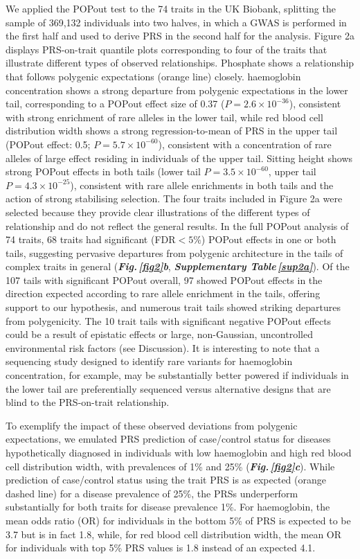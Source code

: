 \documentclass[12pt]{zHenriquesLab-StyleBioRxiv}
\newcommand\dref[2]{\normalsize{\textbf{\textit{Fig.\,\ref{#1}#2}}}\normalsize{}}
\newcommand\stref[1]{\normalsize{\textbf{\textit{Supplementary Table\,\ref{#1}}}}\normalsize{}}
\begin{document}
%
We applied the POPout test to the 74 traits in the UK Biobank, 
splitting the sample of 369,132 individuals into two halves, 
in which a GWAS is performed in the first half and used to derive 
PRS in the second half for the analysis. 
Figure 2a  displays PRS-on-trait quantile plots corresponding 
to four of the traits that illustrate different types of 
observed relationships. Phosphate shows a relationship that 
follows polygenic expectations (orange line) closely. 
haemoglobin concentration shows a strong departure from 
polygenic expectations in the lower tail, corresponding 
to a POPout effect size of 0.37 ($P = 2.6 \times 10^{-36}$), 
consistent with strong enrichment of rare alleles in the lower 
tail, while red blood cell distribution width shows a strong 
regression-to-mean of PRS in the upper tail (POPout effect: 
0.5; $P = 5.7 \times 10^{-60}$), consistent with a concentration
of rare alleles of large effect residing in individuals of 
the upper tail. Sitting height shows strong POPout effects in both 
tails (lower tail $P = 3.5 \times 10^{-60}$, upper 
tail $P = 4.3 \times 10^{-25}$), consistent with rare allele 
enrichments in both tails and the action of strong 
stabilising selection. The four traits included in Figure 2a 
were selected because they provide clear illustrations 
of the different types of relationship and do not reflect 
the general results. In the full POPout analysis of 74 traits, 
68 traits had significant (FDR$<5\%$) POPout effects in one or both 
tails, suggesting pervasive departures from polygenic 
architecture in the tails of complex traits in 
general (\dref{fig2}{b}, \stref{sup2a}). 
Of the 107 tails with significant 
POPout overall, 97 showed POPout effects in the 
direction expected according to rare allele enrichment 
in the tails, offering support to our hypothesis, and 
numerous trait tails showed striking departures from polygenicity. 
The 10 trait tails with significant negative POPout effects 
could be a result of epistatic effects or large, non-Gaussian, 
uncontrolled environmental risk factors (see Discussion). 
It is interesting to note that a sequencing study designed 
to identify rare variants for haemoglobin concentration, 
for example, may be substantially better powered if 
individuals in the lower tail are preferentially sequenced 
versus alternative designs that are blind to the PRS-on-trait 
relationship.

To exemplify the impact of these observed deviations from 
polygenic expectations, we emulated PRS prediction of 
case/control status for diseases hypothetically diagnosed 
in individuals with low haemoglobin and high red blood cell 
distribution width, with prevalences of 1\% and 25\% (\dref{fig2}{c}). 
While prediction of case/control status using the trait PRS 
is as expected (orange dashed line) for a disease prevalence 
of 25\%, the PRSs underperform substantially for both 
traits for disease prevalence 1\%. For haemoglobin, the mean 
odds ratio (OR) for individuals in the bottom 5\% of PRS is 
expected to be 3.7 but is in fact 1.8, while, for red blood 
cell distribution width, the mean OR for individuals 
with top 5\% PRS values is 1.8 instead of an expected 4.1.
%
\end{document}
